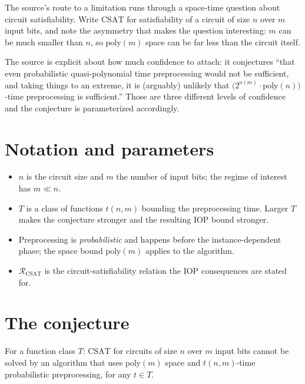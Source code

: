 \documentclass{conjura-conjecture}
\newcommand{\CSAT}{\mathrm{CSAT}}
\newcommand{\RCSAT}{\mathcal{R}_{\mathrm{CSAT}}}
\begin{document}
The source's route to a limitation runs through a space-time question
about circuit satisfiability. Write $\CSAT$ for satisfiability of a
circuit of size $n$ over $m$ input bits, and note the asymmetry that
makes the question interesting: $m$ can be much smaller than $n$, so
$\mathrm{poly}(m)$ space can be far less than the circuit itself.

The source is explicit about how much confidence to attach: it conjectures
``that even probabilistic quasi-polynomial time preprocessing would not
be sufficient, and taking things to an extreme, it is (arguably) unlikely
that $\bigl(2^{o(m)}\cdot\mathrm{poly}(n)\bigr)$-time preprocessing is
sufficient.'' Those are three different levels of confidence and the
conjecture is parameterized accordingly.

\section{Notation and parameters}\label{sec:notation}

\begin{itemize}[nosep]
  \item $n$ is the circuit size and $m$ the number of input bits; the
    regime of interest has $m \ll n$.
  \item $T$ is a class of functions $t(n,m)$ bounding the preprocessing
    time. Larger $T$ makes the conjecture stronger and the resulting IOP
    bound stronger.
  \item Preprocessing is \emph{probabilistic} and happens before the
    instance-dependent phase; the space bound $\mathrm{poly}(m)$ applies
    to the algorithm.
  \item $\RCSAT$ is the circuit-satisfiability relation the IOP
    consequences are stated for.
\end{itemize}

\section{The conjecture}\label{sec:conjectures}

\begin{conjecture}[{\cite[Conjecture 1.2]{NR22}}]\label{conj:main}
For a function class $T$: $\CSAT$ for circuits of size $n$ over $m$ input
bits cannot be solved by an algorithm that uses $\mathrm{poly}(m)$ space
and $t(n,m)$-time probabilistic preprocessing, for any $t \in T$.
\end{conjecture}
\end{document}
